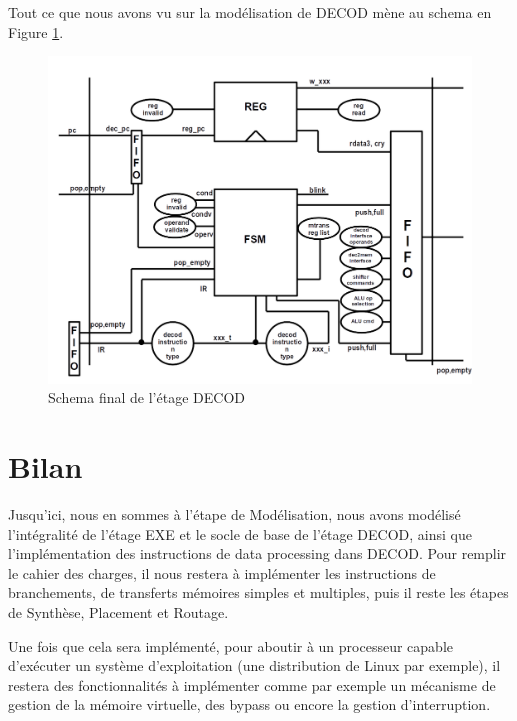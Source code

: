 \documentclass{article}
\begin{document}
Tout ce que nous avons vu sur la modélisation de DECOD mène au schema en Figure \ref{dec}.

\begin{figure}[H]
\includegraphics[width=\textwidth]{pics/dec.png}
\centering
\caption{Schema final de l'étage DECOD}
\label{dec}
\end{figure}

\section{Bilan}

Jusqu'ici, nous en sommes à l'étape de Modélisation, nous avons modélisé l'intégralité de l'étage EXE
et le socle de base de l'étage DECOD, ainsi que l'implémentation des instructions de data processing dans DECOD.
Pour remplir le cahier des charges, il nous restera à implémenter les instructions de branchements, de
transferts mémoires simples et multiples, puis il reste les étapes de Synthèse, Placement et Routage.

Une fois que cela sera implémenté, pour aboutir à un processeur capable d'exécuter un système d'exploitation
(une distribution de Linux par exemple), il restera des fonctionnalités à implémenter comme par exemple
un mécanisme de gestion de la mémoire virtuelle, des bypass ou encore la gestion d'interruption.

\end{document}
